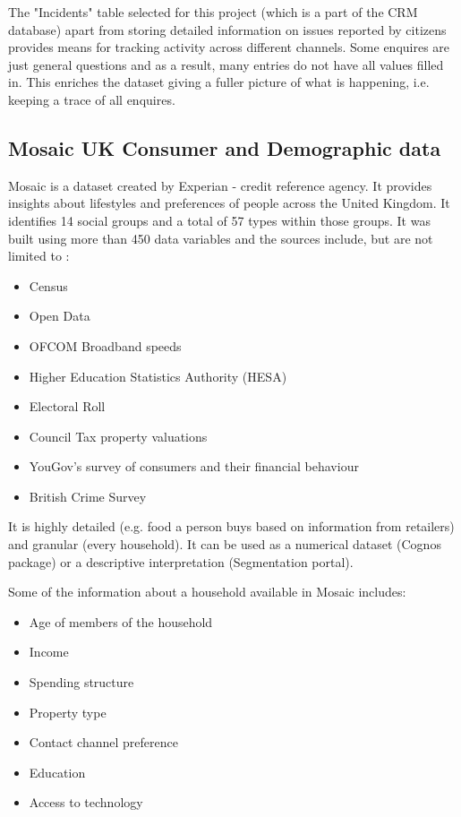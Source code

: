 The "Incidents" table selected for this project (which is a part of the CRM database) apart from storing detailed information on issues reported by citizens provides means for tracking activity across different channels. Some enquires are just general questions and as a result, many entries do not have all values filled in. This enriches the dataset giving a fuller picture of what is happening, i.e. keeping a trace of all enquires.		
		
		\subsection{Mosaic UK Consumer and Demographic data}
		
Mosaic is a dataset created by Experian - credit reference agency. It provides insights about lifestyles and preferences of people across the United Kingdom. It identifies 14 social groups and a total of 57 types within those groups. It was built using more than 450 data variables and the sources include, but are not limited to \citep{Experian2014}:	

\begin{itemize}
\item Census
\item Open Data
\item OFCOM Broadband speeds
\item Higher Education Statistics Authority (HESA)
\item Electoral Roll
\item Council Tax property valuations
\item YouGov's survey of consumers and their financial behaviour
\item British Crime Survey
\end{itemize}

It is highly detailed (e.g. food a person buys based on information from retailers) and granular (every household). It can be used as a numerical dataset (Cognos package) or a descriptive interpretation (Segmentation portal).

Some of the information about a household available in Mosaic includes:

\begin{itemize}
\item Age of members of the household
\item Income
\item Spending structure
\item Property type
\item Contact channel preference
\item Education
\item Access to technology
\end{itemize}
	
